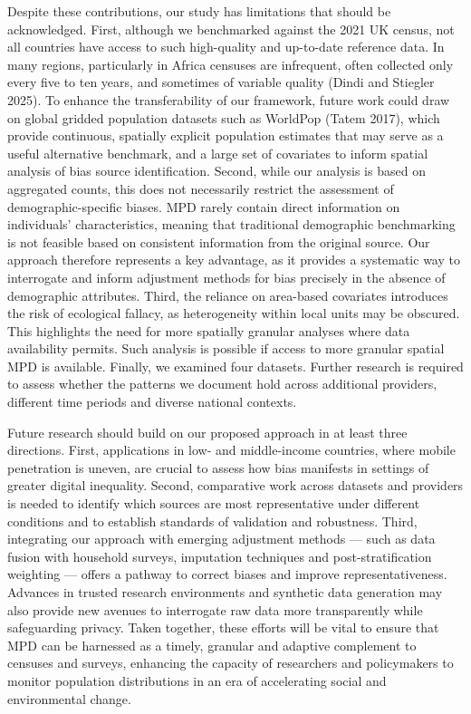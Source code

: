 \documentclass{article}
\begin{document}
Despite these contributions, our study has limitations that should be
acknowledged. First, although we benchmarked against the 2021 UK census,
not all countries have access to such high-quality and up-to-date
reference data. In many regions, particularly in Africa censuses are
infrequent, often collected only every five to ten years, and sometimes
of variable quality (Dindi and Stiegler 2025). To enhance the transferability of our
framework, future work could draw on global gridded population datasets
such as WorldPop (Tatem 2017), which provide continuous, spatially
explicit population estimates that may serve as a useful alternative
benchmark, and a large set of covariates to inform spatial analysis of
bias source identification. Second, while our analysis is based on
aggregated counts, this does not necessarily restrict the assessment of
demographic-specific biases. MPD rarely contain direct information on
individuals' characteristics, meaning that traditional demographic
benchmarking is not feasible based on consistent information from the
original source. Our approach therefore represents a key advantage, as
it provides a systematic way to interrogate and inform adjustment
methods for bias precisely in the absence of demographic attributes.
Third, the reliance on area-based covariates introduces the risk of
ecological fallacy, as heterogeneity within local units may be obscured.
This highlights the need for more spatially granular analyses where data
availability permits. Such analysis is possible if access to more
granular spatial MPD is available. Finally, we examined four datasets.
Further research is required to assess whether the patterns we document
hold across additional providers, different time periods and diverse
national contexts.

Future research should build on our proposed approach in at least three
directions. First, applications in low- and middle-income countries,
where mobile penetration is uneven, are crucial to assess how bias
manifests in settings of greater digital inequality. Second, comparative
work across datasets and providers is needed to identify which sources
are most representative under different conditions and to establish
standards of validation and robustness. Third, integrating our approach
with emerging adjustment methods --- such as data fusion with household
surveys, imputation techniques and post-stratification weighting ---
offers a pathway to correct biases and improve representativeness.
Advances in trusted research environments and synthetic data generation
may also provide new avenues to interrogate raw data more transparently
while safeguarding privacy. Taken together, these efforts will be vital
to ensure that MPD can be harnessed as a timely, granular and adaptive
complement to censuses and surveys, enhancing the capacity of
researchers and policymakers to monitor population distributions in an
era of accelerating social and environmental change.
\end{document}
